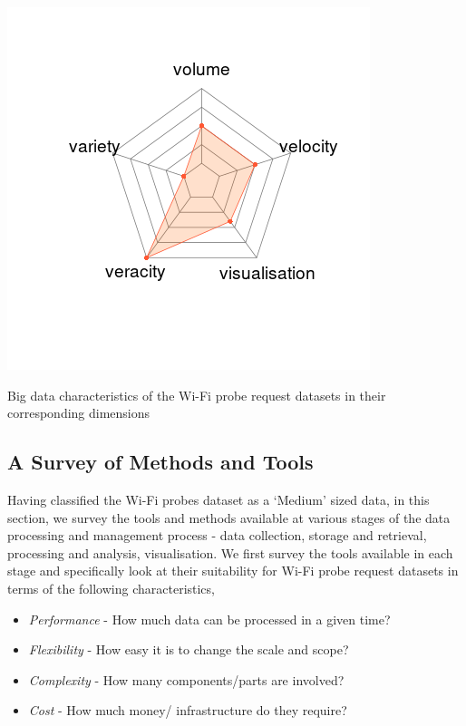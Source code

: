 \begin{marginfigure}[5cm]
  \includegraphics[trim={2.1cm 0 0 0},clip]{images/spider.png}
  \caption{Big data characteristics of the Wi-Fi probe request datasets in their corresponding dimensions}
  \label{figure:toolkit:spider}
\end{marginfigure}


\subsection{A Survey of Methods and Tools}

Having classified the Wi-Fi probes dataset as a `Medium' sized data, in this section, we survey the tools and methods available at various stages of the data processing and management process - data collection, storage and retrieval, processing and analysis, visualisation.
We first survey the tools available in each stage and specifically look at their suitability for Wi-Fi probe request datasets in terms of the following characteristics,

\begin{itemize}
  \setlength{\itemindent}{1em}
  \itemsep-0.25em
  \item \textit{Performance} - How much data can be processed in a given time?
  \item \textit{Flexibility} - How easy it is to change the scale and scope?
  \item \textit{Complexity} - How many components/parts are involved?
  \item \textit{Cost} - How much money/ infrastructure do they require?
\end{itemize}

